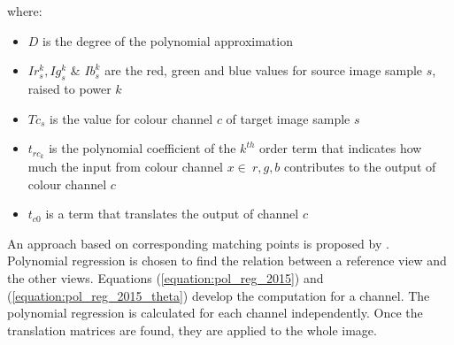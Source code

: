 where:

\begin{itemize}
    \item $D$ is the degree of the polynomial approximation
    \item $I r_{s}^{k}, I g_{s}^{k}$ \& $I b_{s}^{k}$ are the red, green and blue values for source image sample $s$, raised to power $k$
    \item $T c_{s}$ is the value for colour channel $c$ of target image sample $s$
    \item $t_{r c_{k}}$ is the polynomial coefficient of the $k^{th}$ order term that indicates how much the input from colour channel $x \in\ {r, g, b}$ contributes to the output of colour channel $c$
    \item $t_{c 0}$ is a term that translates the output of channel $c$
\end{itemize}



An approach based on corresponding matching points is proposed by \cite{eschbach_color_2015}. Polynomial regression is chosen to find the relation between a reference view and the other views. Equations (\ref{equation:pol_reg_2015}) and (\ref{equation:pol_reg_2015_theta}) develop the computation for a channel. The polynomial regression is calculated for each channel independently. Once the translation matrices are found, they are applied to the whole image.



